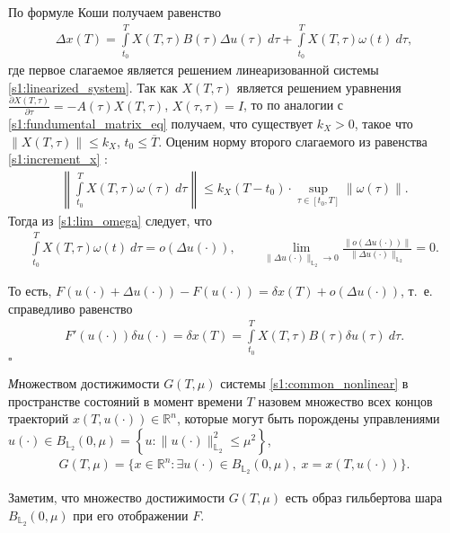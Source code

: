 \documentclass[../main.tex]{subfiles}
\begin{document}
По формуле Коши получаем равенство
\begin{gather}\label{s1:increment_x}
	\Delta x(T) = \int\limits_{t_0}^{T} X(T, \tau) B(\tau) \Delta u(\tau) \ d\tau + \int\limits_{t_0}^{T} X(T, \tau) \omega(t) \ d\tau,
\end{gather}
где первое слагаемое является решением линеаризованной системы \eqref{s1:linearized_system}.
Так как $X(T, \tau) $ является решением уравнения $\frac{\partial X(T, \tau) }{\partial \tau} = -A(\tau)X(T, \tau)$, $X(\tau, \tau) = I$, то по аналогии с \eqref{s1:fundumental_matrix_eq} получаем, что существует $k_X > 0$, такое что $\|X(T, \tau) \| \leqslant k_X$, $t_0 \leqslant \overline{T} $.
Оценим норму второго слагаемого из равенства \eqref{s1:increment_x} :
\begin{gather*}
	\left\| \int\limits_{t_0}^T X(T,\tau)\omega(\tau) \ d\tau \right\| \leqslant k_X (T-t_0) \cdot \sup\limits_{\tau \in [t_0, T]} \|\omega(\tau)\|.
\end{gather*}
Тогда из \eqref{s1:lim_omega} следует, что 
\begin{gather*}
 \int\limits_{t_0}^{T} X(T, \tau) \omega(t) \ d\tau = o(\Delta u(\cdot)), \qquad \lim\limits_{\|\Delta u(\cdot) \|_{\mathbb{L}_2} \to 0} \frac{ \| o(\Delta u(\cdot)) \| }{\|\Delta u(\cdot) \|_{\mathbb{L}_2}} = 0.
\end{gather*}
 
То есть, $F(u(\cdot) + \Delta u(\cdot)) - F(u(\cdot)) = \delta x(T) + o(\Delta u(\cdot))$, т.~е. справедливо равенство
\begin{gather}\label{s1:lem2_assert}
 F'(u(\cdot))\delta u(\cdot) =\delta x(T) = \int\limits_{t_0}^{T} X(T, \tau) B(\tau) \delta u(\tau) \ d\tau.
\end{gather}
\hfill $\square$
 
\begin{definition}
 {\textit Множеством достижимости} $ G(T,\mu) $ системы \eqref{s1:common_nonlinear} в пространстве состояний в момент времени $ T $ назовем множество всех концов траекторий $ x(T, u(\cdot)) \in \mathbb{R}^n $, которые могут быть порождены управлениями $ u(\cdot) \in B_{\mathbb{L}_2}(0,\mu) =\left\lbrace u:\lVert u(\cdot)\rVert^2_{\mathbb{L}_2} \leqslant \mu^2\right\rbrace $,
 \begin{gather*}
 G(T,\mu)=\{x\in \mathbb{R}^n:\exists u(\cdot)\in B_{\mathbb{L}_2}(0,\mu),\; x=x(T,u(\cdot))\}.
 \end{gather*}
\end{definition}
 
Заметим, что множество достижимости $G(T,\mu)$ есть образ гильбертова шара $B_{\mathbb{L}_2}(0,\mu)$ при его отображении $F$.
 
\end{document}

